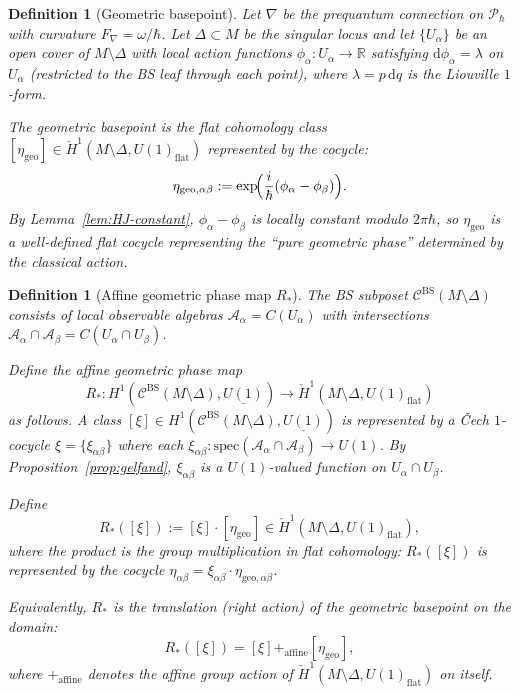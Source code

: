 \documentclass[11pt]{article}
\newtheorem{definition}[theorem]{Definition}
\begin{document}
\begin{definition}[Geometric basepoint]
\label{def:geometric-basepoint}
Let $\nabla$ be the prequantum connection on $\mathcal{P}_\hbar$ with
curvature $F_\nabla = \omega/\hbar$. Let $\Delta \subset M$ be the
singular locus and let $\{U_\alpha\}$ be an open cover of
$M \setminus \Delta$ with local action functions $\phi_\alpha: U_\alpha \to \mathbb{R}$
satisfying $\mathrm{d}\phi_\alpha = \lambda$ on $U_\alpha$ (restricted to the BS leaf through each point), where $\lambda = p\,\mathrm{d}q$
is the Liouville $1$-form.

The \emph{geometric basepoint} is the flat cohomology class
$[\eta_{\mathrm{geo}}] \in \check{H}^1(M \setminus \Delta, U(1)_{\mathrm{flat}})$
represented by the cocycle:
\[
\eta_{\mathrm{geo},\alpha\beta} := \exp\!\Bigl(\frac{i}{\hbar}(\phi_\alpha - \phi_\beta)\Bigr).
\]
By Lemma~\ref{lem:HJ-constant}, $\phi_\alpha - \phi_\beta$ is locally
constant modulo $2\pi\hbar$, so $\eta_{\mathrm{geo}}$ is a well-defined
flat cocycle representing the ``pure geometric phase'' determined by
the classical action.
\end{definition}

\begin{definition}[Affine geometric phase map $R_*$]
\label{def:R-star}
The BS subposet $\mathcal{C}^{\mathrm{BS}}(M \setminus \Delta)$ consists of
local observable algebras $\mathcal{A}_\alpha = C(U_\alpha)$ with
intersections $\mathcal{A}_\alpha \cap \mathcal{A}_\beta = C(U_\alpha \cap U_\beta)$.

Define the \emph{affine geometric phase map}
\[
R_*: H^1(\mathcal{C}^{\mathrm{BS}}(M \setminus \Delta), \underline{U(1)})
\longrightarrow \check{H}^1(M \setminus \Delta, U(1)_{\mathrm{flat}})
\]
as follows. A class $[\xi] \in H^1(\mathcal{C}^{\mathrm{BS}}(M \setminus \Delta), \underline{U(1)})$
is represented by a \v{C}ech $1$-cocycle $\xi = \{\xi_{\alpha\beta}\}$
where each $\xi_{\alpha\beta}: \mathrm{spec}(\mathcal{A}_\alpha \cap \mathcal{A}_\beta) \to U(1)$.
By Proposition~\ref{prop:gelfand}, $\xi_{\alpha\beta}$ is a $U(1)$-valued function
on $U_\alpha \cap U_\beta$.

Define
\[
R_*([\xi]) := [\xi] \cdot [\eta_{\mathrm{geo}}]
\in \check{H}^1(M \setminus \Delta, U(1)_{\mathrm{flat}}),
\]
where the product is the group multiplication in flat cohomology:
$R_*([\xi])$ is represented by the cocycle
$\eta_{\alpha\beta} = \xi_{\alpha\beta} \cdot \eta_{\mathrm{geo},\alpha\beta}$.

Equivalently, $R_*$ is the \emph{translation} (right action) of the
geometric basepoint on the domain:
\[
R_*([\xi]) = [\xi] +_{\mathrm{affine}} [\eta_{\mathrm{geo}}],
\]
where $+_{\mathrm{affine}}$ denotes the affine group action of
$\check{H}^1(M \setminus \Delta, U(1)_{\mathrm{flat}})$ on itself.
\end{definition}
\end{document}
